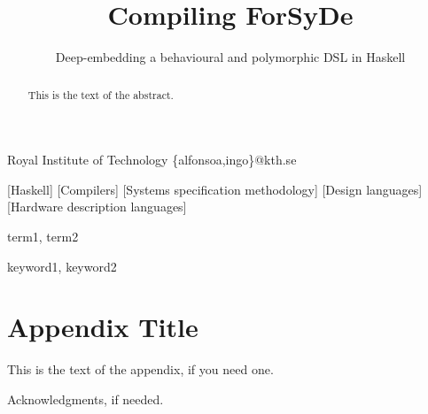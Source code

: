 \documentclass[preprint,natbib]{sigplanconf}
\begin{document}

\preprintfooter{}                                             %

\title{Compiling ForSyDe}
\subtitle{Deep-embedding a behavioural and polymorphic DSL in Haskell}

           {Royal Institute of Technology}
           {\{alfonsoa,ingo\}@kth.se}

\maketitle

\begin{abstract}
This is the text of the abstract.
\end{abstract}

[Haskell]
[Compilers]
[Systems specification methodology]
[Design languages]
[Hardware description languages]

\terms
term1, term2

\keywords
keyword1, keyword2










\appendix
\section{Appendix Title}

This is the text of the appendix, if you need one.

\acks

Acknowledgments, if needed.



\end{document}
